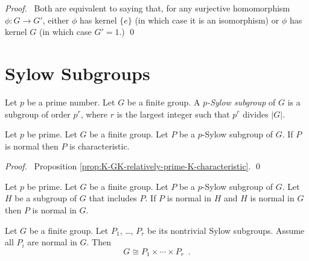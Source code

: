 \begin{proof}
\pf\ Both are equivalent to saying that, for any surjective homomorphism $\phi : G \rightarrow G'$, either $\phi$ has kernel $\{e\}$ (in which case it is an isomorphism) or $\phi$ has kernel $G$ (in which case $G' = 1$.) \qed
\end{proof}

\section{Sylow Subgroups}

\begin{df}
Let $p$ be a prime number. Let $G$ be a finite group. A \emph{$p$-Sylow subgroup} of $G$ is a subgroup of order $p^r$, where $r$ is the largest integer such that $p^r$ divides $|G|$.
\end{df}

\begin{prop}
Let $p$ be prime. Let $G$ be a finite group. Let $P$ be a $p$-Sylow subgroup of $G$. If $P$ is normal then $P$ is characteristic.
\end{prop}

\begin{proof}
\pf\ Proposition \ref{prop:K-GK-relatively-prime-K-characteristic}. \qed
\end{proof}

\begin{cor}
\label{cor:normal-normal-normal}
Let $p$ be prime. Let $G$ be a finite group. Let $P$ be a $p$-Sylow subgroup of $G$. Let $H$ be a subgroup of $G$ that includes $P$. If $P$ is normal in $H$ and $H$ is normal in $G$ then $P$ is normal in $G$.
\end{cor}

\begin{prop}
\label{prop:P1-times-cdots-times-Pr}
Let $G$ be a finite group. Let $P_1$, \ldots, $P_r$ be its nontrivial Sylow subgroups. Assume all $P_i$ are normal in $G$. Then
\[ G \cong P_1 \times \cdots \times P_r \enspace . \]
\end{prop}

